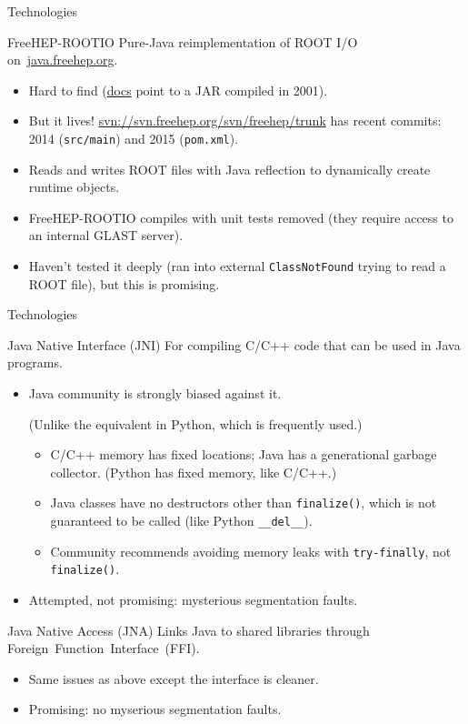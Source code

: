\documentclass{beamer}
\begin{document}
\begin{frame}{Technologies}

\begin{block}{FreeHEP-ROOTIO}
Pure-Java reimplementation of ROOT I/O \mbox{on \url{java.freehep.org}.\hspace{-1 cm}}
\begin{itemize}
\item Hard to find (\href{http://java.freehep.org/freehep-rootio/}{docs} point to a JAR compiled in 2001).
\item But it lives! {\scriptsize \url{svn://svn.freehep.org/svn/freehep/trunk}} has recent commits: 2014 ({\tt src/main}) and 2015 ({\tt pom.xml}).
\item Reads and writes ROOT files with Java reflection to dynamically create runtime objects.
\item FreeHEP-ROOTIO compiles with unit tests removed (they require access to an internal GLAST server).
\item Haven't tested it deeply (ran into external {\tt ClassNotFound} trying to read a ROOT file), but this is promising.
\end{itemize}
\end{block}
\end{frame}

\begin{frame}{Technologies}
\begin{block}{Java Native Interface (JNI)}
For compiling C/C++ code that can be used in Java programs.
\begin{itemize}
\item Java community is strongly biased against it.

(Unlike the equivalent in Python, which is frequently used.)
\begin{itemize}
\item C/C++ memory has fixed locations; Java has a generational garbage collector. (Python has fixed memory, like C/C++.)
\item Java classes have no destructors other than {\tt finalize()}, which is not guaranteed to be called (like Python {\tt \_\_del\_\_}).
\item Community recommends avoiding memory leaks with {\tt try-finally}, not {\tt finalize()}.
\end{itemize}
\item Attempted, not promising: mysterious segmentation faults.
\end{itemize}
\end{block}

\begin{block}{Java Native Access (JNA)}
Links Java to shared libraries through \mbox{Foreign Function Interface (FFI).\hspace{-1 cm}}
\begin{itemize}
\item Same issues as above except the interface is cleaner.
\item Promising: no myserious segmentation faults.
\end{itemize}
\end{block}
\end{frame}
\end{document}
